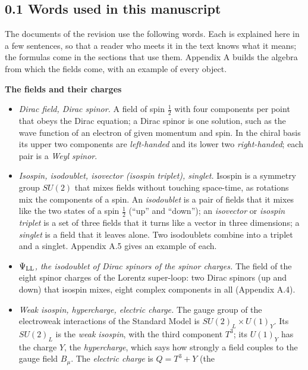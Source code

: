 \documentclass[
  10pt,
]{article}
\providecommand{\tightlist}{%
  \setlength{\itemsep}{0pt}\setlength{\parskip}{0pt}}
\begin{document}
\hypertarget{words-used-in-this-manuscript}{%
\subsection{0.1 Words used in this
manuscript}\label{words-used-in-this-manuscript}}

The documents of the revision use the following words. Each is explained
here in a few sentences, so that a reader who meets it in the text knows
what it means; the formulas come in the sections that use them. Appendix
A builds the algebra from which the fields come, with an example of
every object.

\textbf{The fields and their charges}

\begin{itemize}
\tightlist
\item
  \emph{Dirac field, Dirac spinor.} A field of spin \(\tfrac12\) with
  four components per point that obeys the Dirac equation; a Dirac
  spinor is one solution, such as the wave function of an electron of
  given momentum and spin. In the chiral basis its upper two components
  are \emph{left-handed} and its lower two \emph{right-handed}; each
  pair is a \emph{Weyl spinor}.
\item
  \emph{Isospin, isodoublet, isovector (isospin triplet), singlet.}
  Isospin is a symmetry group \(SU(2)\) that mixes fields without
  touching space-time, as rotations mix the components of a spin. An
  \emph{isodoublet} is a pair of fields that it mixes like the two
  states of a spin \(\tfrac12\) (``up'' and ``down''); an
  \emph{isovector} or \emph{isospin triplet} is a set of three fields
  that it turns like a vector in three dimensions; a \emph{singlet} is a
  field that it leaves alone. Two isodoublets combine into a triplet and
  a singlet. Appendix A.5 gives an example of each.
\item
  \emph{\(\Psi_{\rm LL}\), the isodoublet of Dirac spinors of the spinor
  charges.} The field of the eight spinor charges of the Lorentz
  super-loop: two Dirac spinors (up and down) that isospin mixes, eight
  complex components in all (Appendix A.4).
\item
  \emph{Weak isospin, hypercharge, electric charge.} The gauge group of
  the electroweak interactions of the Standard Model is
  \(SU(2)_L\times U(1)_Y\). Its \(SU(2)_L\) is the \emph{weak isospin},
  with the third component \(T^3\); its \(U(1)_Y\) has the charge \(Y\),
  the \emph{hypercharge}, which says how strongly a field couples to the
  gauge field \(B_\mu\). The \emph{electric charge} is \(Q=T^3+Y\) (the

\end{itemize}
\end{document}
